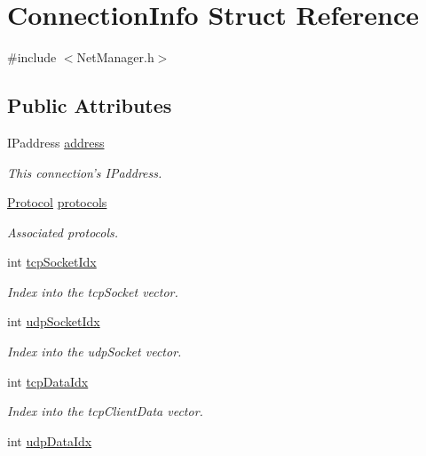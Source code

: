 \hypertarget{structConnectionInfo}{\section{Connection\-Info Struct Reference}
\label{structConnectionInfo}
}


{\ttfamily \#include $<$Net\-Manager.\-h$>$}

\subsection*{Public Attributes}
\begin{DoxyCompactItemize}
\item 
I\-Paddress \hyperlink{structConnectionInfo_af014df0a6739ea51a6a532ec352f7848}{address}
\begin{DoxyCompactList}\small\item\em This connection's I\-Paddress. \end{DoxyCompactList}\item 
\hyperlink{NetManager_8h_a9af285d1232beed01f31aac5d3a5469f}{Protocol} \hyperlink{structConnectionInfo_ad2f23f71b9b3e1a1ac56da62b7ef8ff0}{protocols}
\begin{DoxyCompactList}\small\item\em Associated protocols. \end{DoxyCompactList}\item 
int \hyperlink{structConnectionInfo_af7e2bde1acff96bc414aae0b7db9c6fe}{tcp\-Socket\-Idx}
\begin{DoxyCompactList}\small\item\em Index into the tcp\-Socket vector. \end{DoxyCompactList}\item 
int \hyperlink{structConnectionInfo_a976929d9eef61ec3aee6984376e3a3cc}{udp\-Socket\-Idx}
\begin{DoxyCompactList}\small\item\em Index into the udp\-Socket vector. \end{DoxyCompactList}\item 
int \hyperlink{structConnectionInfo_a5e710f945112e21b4f9d21f3ffff8ebf}{tcp\-Data\-Idx}
\begin{DoxyCompactList}\small\item\em Index into the tcp\-Client\-Data vector. \end{DoxyCompactList}\item 
int \hyperlink{structConnectionInfo_a765196ed390588341d9dc01606f5a6ed}{udp\-Data\-Idx}

\end{DoxyCompactItemize}
